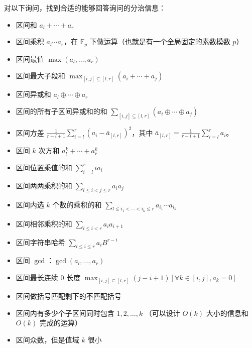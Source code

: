 \begin{exercise}\label{exercise: design range info}
    对以下询问，找到合适的能够回答询问的分治信息：
    \begin{itemize}
        \item 区间和 $a_l+\cdots+a_r$
        \item 区间乘积 $a_l\cdots a_r$，在 $\mathbb F_p$ 下做运算（也就是有一个全局固定的素数模数 $p$）
        \item 区间最值 $\max(a_l,\ldots,a_r)$
        \item 区间最大子段和 $\max_{[i,j]\subseteq [l,r]} (a_i+\cdots+a_j)$
        \item 区间异或和 $a_l\oplus\cdots\oplus a_r$
        \item 区间的所有子区间异或和的和 $\sum_{[i,j]\subseteq [l,r]}(a_i\oplus\cdots\oplus a_j)$
        \item 区间方差 $\frac{1}{r-l+1}\sum_{i=l}^r (a_i-\bar a_{[l,r]})^2$，其中 $\bar a_{[l,r]}=\frac{1}{r-l+1}\sum_{i=l}^r a_i$。
        \item 区间 $k$ 次方和 $a_l^k+\cdots+a_r^k$
        \item 区间位置乘值的和 $\sum_{i=l}^r ia_i$
        \item 区间两两乘积的和 $\sum_{l\le i<j\le r}a_ia_j$
        \item 区间内选 $k$ 个数的乘积的和 $\sum_{l\le i_1<\cdots <i_k\le r}a_{i_1}\cdots a_{i_k}$
        \item 区间相邻乘积的和 $\sum_{l\le i<r}a_ia_{i+1}$
        \item 区间字符串哈希 $\sum_{l\le i\le r}a_i B^{r-i}$
        \item 区间 $\gcd$：$\gcd(a_l,\ldots,a_r)$
        \item 区间最长连续 $0$ 长度 $\max_{[i,j]\subseteq [l,r]}(j-i+1)[\forall k\in [i,j],a_k=0]$
        \item 区间做括号匹配剩下的不匹配括号
        \item 区间内有多少个子区间同时包含 $1,2,\ldots,k$ （可以设计 $O(k)$ 大小的信息和 $O(k)$ 完成的运算）
        \item 区间众数，但是值域 $k$ 很小
    \end{itemize}    
\end{exercise}

